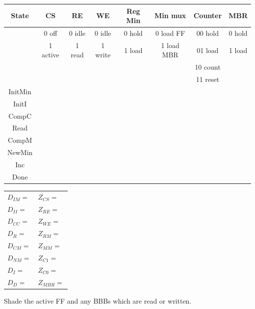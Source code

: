 \begin{description}
\begin{tabular}{c||c|c|c|c|c|c|c}  
State   & CS       & RE     &  WE      &  Reg Min  & Min mux       & Counter & MBR	\\ \hline
        & 0 off    & 0 idle & 0 idle   &  0 hold   & 0 load FF     & 00 hold & 0 hold	\\ \hline
        & 1 active & 1 read & 1 write  &  1 load   & 1 load MBR    & 01 load & 1 load	\\ \hline
        &          &       &           &           &               & 10 count& 		\\ \hline
        &          &       &           &           &               & 11 reset& \\ \hline \hline
InitMin &         &      &          &          &              &       &    \\ \hline
InitI   &         &      &          &          &              &       &    \\ \hline
CompC   &         &      &          &          &              &       &    \\ \hline
Read    &         &      &          &          &              &       &    \\ \hline
CompM   &         &      &          &          &              &       &    \\ \hline
NewMin  &         &      &          &          &              &       &    \\ \hline
Inc     &         &      &          &          &              &       &    \\ \hline
Done    &         &      &          &          &              &       &    \\ 
\end{tabular}

\begin{tabular}{p{2in}p{1in}}
$D_{IM} =$	&	$Z_{CS} =$  		\\
$D_{II} =$ 	&	$Z_{RE} =$ 		\\
$D_{CC} =$	&	$Z_{WE} =$  		\\
$D_{R} = $	&	$Z_{RM} =$ 		\\
$D_{CM} =$ 	&	$Z_{MM} =$ 		\\
$D_{NM} =$ 	&	$Z_{C1} =$ 		\\
$D_{I} = $	&	$Z_{C0} =$ 		\\
$D_{D} = $	&	$Z_{MBR} =$ 		\\
\end{tabular}

\pagebreak
Shade the active FF and any BBBs which are read or written.


\end{description}

